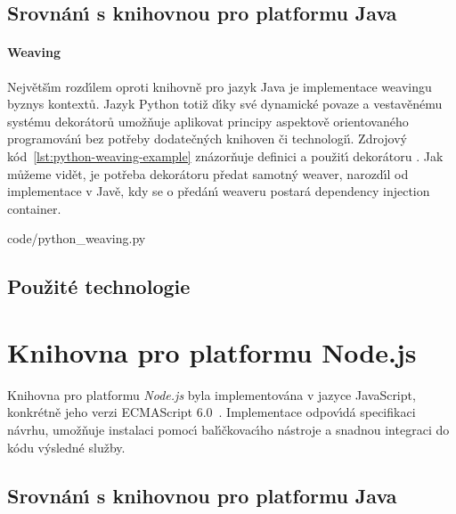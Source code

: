 \subsection{Srovnán\'{\i} s knihovnou pro platformu Java}

\paragraph{Weaving} Největš\'{\i}m rozd\'{\i}lem oproti knihovně pro
jazyk Java je implementace weavingu byznys kontextů.
Jazyk Python totiž d\'{\i}ky své dynamické povaze a vestavěnému
systému dekorátorů umožňuje aplikovat principy aspektově orientovaného
programován\'{\i} bez potřeby dodatečn\'ych knihoven či technologi\'{\i}.
Zdrojov\'y kód~\ref{lst:python-weaving-example} znázorňuje
definici a použit\'{\i} dekorátoru .
Jak můžeme vidět, je potřeba dekorátoru předat samotn\'y weaver, narozd\'{\i}l
od implementace v Javě, kdy se o předán\'{\i} weaveru postará dependency
injection container.


{code/python_weaving.py}

\paragraph{}

\subsection{Použité technologie}

\section{Knihovna pro platformu Node.js}

Knihovna pro platformu \textit{Node.js} byla implementována
v jazyce JavaScript, konkrétně jeho verzi
ECMAScript 6.0~\cite{ecma60}.
Implementace odpov\'{\i}dá specifikaci návrhu, umožňuje
instalaci pomoc\'{\i} bal\'{\i}čkovac\'{\i}ho nástroje a snadnou
integraci do kódu v\'ysledné služby.

\subsection{Srovnán\'{\i} s knihovnou pro platformu Java}

